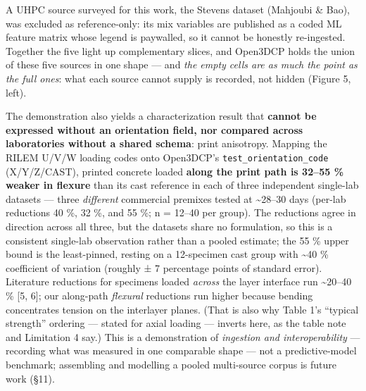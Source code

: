 \documentclass[
  11pt,
  letterpaper,
]{article}
\begin{document}
A UHPC source surveyed for this work, the Stevens dataset (Mahjoubi \&
Bao), was excluded as reference-only: its mix variables are published as
a coded ML feature matrix whose legend is paywalled, so it cannot be
honestly re-ingested. Together the five light up complementary slices,
and Open3DCP holds the union of these five sources in one shape --- and
\emph{the empty cells are as much the point as the full ones}: what each
source cannot supply is recorded, not hidden (Figure 5, left).

The demonstration also yields a characterization result that
\textbf{cannot be expressed without an orientation field, nor compared
across laboratories without a shared schema}: print anisotropy. Mapping
the RILEM U/V/W loading codes onto Open3DCP's
\texttt{test\_orientation\_code} (X/Y/Z/CAST), printed concrete loaded
\textbf{along the print path is 32--55 \% weaker in flexure} than its
cast reference in each of three independent single-lab datasets ---
three \emph{different} commercial premixes tested at
\textasciitilde28--30 days (per-lab reductions 40 \%, 32 \%, and 55 \%;
n = 12--40 per group). The reductions agree in direction across all
three, but the datasets share no formulation, so this is a consistent
single-lab observation rather than a pooled estimate; the 55 \% upper
bound is the least-pinned, resting on a 12-specimen cast group with
\textasciitilde40 \% coefficient of variation (roughly ± 7 percentage
points of standard error). Literature reductions for specimens loaded
\emph{across} the layer interface run \textasciitilde20--40 \% {[}5,
6{]}; our along-path \emph{flexural} reductions run higher because
bending concentrates tension on the interlayer planes. (That is also why
Table 1's ``typical strength'' ordering --- stated for axial loading ---
inverts here, as the table note and Limitation 4 say.) This is a
demonstration of \emph{ingestion and interoperability} --- recording
what was measured in one comparable shape --- not a predictive-model
benchmark; assembling and modelling a pooled multi-source corpus is
future work (§11).
\end{document}
